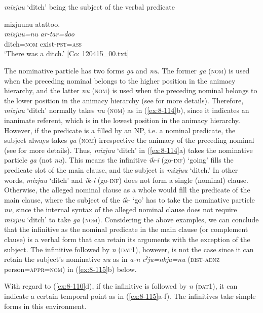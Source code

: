 \ex \textit{mizjuu} ‘ditch’ being the subject of the verbal predicate

  {\TM}
\glll  mizjuunu  atattoo.\\
\textit{mizjuu=nu}  \textit{ar-tar=doo}      \\
    ditch=\textsc{nom}  exist-\textsc{pst}=\textsc{ass}\\
\glt ‘There was a ditch.’ [Co: 120415\_00.txt]
\z
\z

The nominative particle has two forms \textit{ga} and \textit{nu}. The former \textit{ga} (\textsc{nom}) is used when the preceding nominal belongs to the higher position in the animacy hierarchy, and the latter \textit{nu} (\textsc{nom}) is used when the preceding nominal belongs to the lower position in the animacy hierarchy (see  for more details). Therefore, \textit{mizjuu} ‘ditch’ normally takes \textit{nu} (\textsc{nom}) as in (\ref{ex:8-114}b), since it indicates an inanimate referent, which is in the lowest position in the animacy hierarchy. However, if the predicate is a filled by an NP, i.e. a nominal predicate, the subject always takes \textit{ga} (\textsc{nom}) irrespective the animacy of the preceding nominal (see  for more details). Thus, \textit{mizjuu} ‘ditch’ in (\ref{ex:8-114}a) takes the nominative particle \textit{ga} (not \textit{nu}). This means the infinitive \textit{ik-i} (go-\textsc{inf}) ‘going’ fills the predicate slot of the main clause, and the subject is \textit{mizjuu} ‘ditch.’ In other words, \textit{mizjuu} ‘ditch’ and \textit{ik-i} (go-\textsc{inf}) does not form a single (nominal) clause. Otherwise, the alleged nominal clause as a whole would fill the predicate of the main clause, where the subject of the \textit{ik-} ‘go’ has to take the nominative particle \textit{nu}, since the internal syntax of the alleged nominal clause does not require \textit{mizjuu} ‘ditch’ to take \textit{ga} (\textsc{nom}). Considering the above examples, we can conclude that the infinitive as the nominal predicate in the main clause (or complement clause) is a verbal form that can retain its arguments with the exception of the subject. The infinitive followed by \textit{n} (\textsc{dat1}), however, is not the case since it can retain the subject’s nominative \textit{nu} as in \textit{a-n} \textit{cˀju=nkja=nu} (\textsc{dist}-\textsc{adnz} person=\textsc{appr}=\textsc{nom}) in (\ref{ex:8-115}b) below.

  With regard to (\ref{ex:8-110}d), if the infinitive is followed by \textit{n} (\textsc{dat1}), it can indicate a certain temporal point as in (\ref{ex:8-115}a-f). The infinitives take simple forms in this environment.

